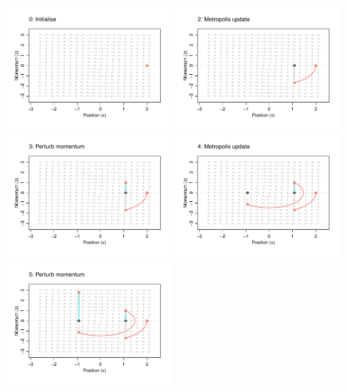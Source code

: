 \begin{figure}[p]
  \vspace{-10pt}
  \includegraphics[width=0.49\textwidth]{figure/04-phase1}
  \vspace{-20pt}
  \includegraphics[width=0.49\textwidth]{figure/04-phase2}
  \vspace{-20pt}
  \includegraphics[width=0.49\textwidth]{figure/04-phase3}
  \includegraphics[width=0.49\textwidth]{figure/04-phase4}
  \vspace{-20pt}
  \includegraphics[width=0.49\textwidth]{figure/04-phase5}

\end{figure}
